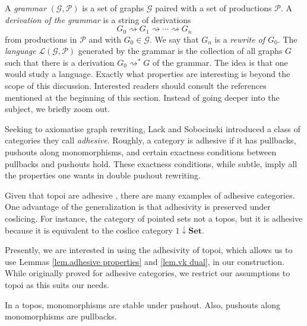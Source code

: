 \documentclass{tac}
\newcommand{\cat}[1]{\mathbf{#1}}
\begin{document}
A \emph{grammar} 
	$ ( \mathcal{ G } , \mathcal{ P } ) $ is a set of graphs $ \mathcal{ G } $ paired with a 
set of productions $\mathcal{P}$. A \textit{derivation of the grammar} 
is a string of derivations 
\[
	G_0 \rightsquigarrow G_1 \rightsquigarrow \dotsm \rightsquigarrow G_n
\] 
from productions in $\mathcal{P}$ and with $G_0 \in \mathcal{G}$. 
We say that $G_n$ is a \emph{rewrite of $G_0$}. The \textit{language} 
	$ \mathcal{ L } ( \mathcal{ G } , \mathcal{ P } ) $ 
generated by the grammar is the collection of all graphs $G$ 
such that there is a derivation $G_0 \rightsquigarrow^\ast G$ of the grammar. 
The idea is that one would study a language. Exactly what properties are interesting 
is beyond the scope of this discussion.  Interested readers should consult the 
references mentioned at the beginning of this section.  
Instead of going deeper into the subject, we briefly zoom out.

Seeking to axiomatise graph rewriting, Lack and Sobocinski 
	\cite{LackSoboc_AdhesiveCategories} 
introduced a class of categories they call \emph{adhesive}. 
Roughly, a category is adhesive if it has pullbacks, pushouts along monomorphisms, 
and certain exactness conditions between pullbacks and pushouts hold. 
These exactness conditions, while subtle, imply all the properties one wants in double pushout rewriting.

Given that topoi are adhesive 
	\cite{LackSoboc_ToposesAdhesive},
there are many examples of adhesive categories. 
One advantage of the generalization is that adhesivity is preserved under coslicing.  For instance, the category of pointed sets not a topos, but it is adhesive because it is equivalent to the coslice category $ 1 \downarrow \cat{ Set } $.

Presently, we are interested in
using the adhesivity of topoi, 
which allows us to use Lemmas
	\ref{lem.adhesive properties}
and 
	\ref{lem.vk dual}, 
in our construction. 
While originally proved for adhesive categories,
we restrict our assumptions to topoi as this suits our needs.                                 

\label{lem.adhesive properties}
	In a topos, monomorphisms are stable under 	pushout. 
	Also, pushouts along monomorphisms are pullbacks.
\endlemma
\end{document}
